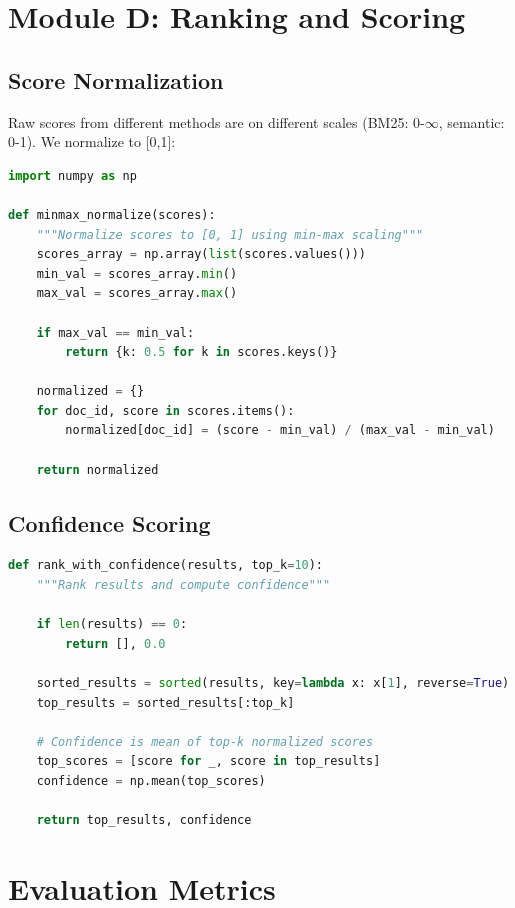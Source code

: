 \documentclass[12pt,a4paper]{report}
\begin{document}
\section{Module D: Ranking and Scoring}

\subsection{Score Normalization}

Raw scores from different methods are on different scales (BM25: 0-$\infty$, semantic: 0-1). We normalize to [0,1]:

\begin{lstlisting}[language=Python, caption=Score Normalization]
import numpy as np

def minmax_normalize(scores):
    """Normalize scores to [0, 1] using min-max scaling"""
    scores_array = np.array(list(scores.values()))
    min_val = scores_array.min()
    max_val = scores_array.max()
    
    if max_val == min_val:
        return {k: 0.5 for k in scores.keys()}
    
    normalized = {}
    for doc_id, score in scores.items():
        normalized[doc_id] = (score - min_val) / (max_val - min_val)
    
    return normalized
\end{lstlisting}

\subsection{Confidence Scoring}

\begin{lstlisting}[language=Python, caption=Confidence-Based Ranking]
def rank_with_confidence(results, top_k=10):
    """Rank results and compute confidence"""
    
    if len(results) == 0:
        return [], 0.0
    
    sorted_results = sorted(results, key=lambda x: x[1], reverse=True)
    top_results = sorted_results[:top_k]
    
    # Confidence is mean of top-k normalized scores
    top_scores = [score for _, score in top_results]
    confidence = np.mean(top_scores)
    
    return top_results, confidence
\end{lstlisting}

\section{Evaluation Metrics}
\end{document}

